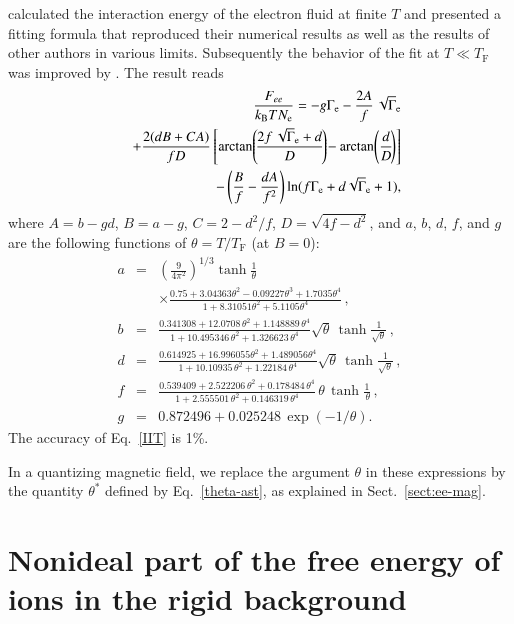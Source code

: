 \documentclass[traditabstract]{aa}
\newcommand{\bea}{\begin{eqnarray}}
\newcommand{\eea}{\end{eqnarray}}
\newcommand{\req}[1]{Eq.~\ref{#1}}
\newcommand{\Gamme}{\Gamma_\mathrm{e}}
\newcommand{\Nel}{N_\mathrm{e}}
\newcommand{\kB}{k_\mathrm{B}}
\newcommand{\TF}{T_\mathrm{F}}
\begin{document}
\citet{Tanaka85} calculated the interaction energy
of the electron fluid at finite $T$ and
presented a fitting formula that reproduced their numerical
results as well as the results of other authors in various limits.
Subsequently the behavior of the fit at $T\ll\TF$ was improved
by \citet{IIT}. The result reads
\bea&&\hspace*{-1em}
   \frac{F_{ee} }{ \kB T \Nel } = - g \Gamme - \frac{2A}{f}\,\sqrt\Gamme
\nonumber\\&&
   +
       \frac{2 (dB+CA)}{ f D }
  \left[\arctan\!\left(\! \frac{2f\,\sqrt\Gamme + d }{ D} \!\right)\!
      - \arctan\!\left(\frac{d}{D}\!\right) \right]
\nonumber\\&&
      - \left( \frac{B}{ f} - \frac{dA }{ f^2} \right)
       \ln ( f\Gamme+d\sqrt\Gamme+1),
\label{IIT}
\eea
where $A=b-gd$, $B=a-g$,
$C=2-d^2/f$, $D=\sqrt{4f-d^2}$, 
and $a$, $b$, $d$, $f$, and
$g$ are the following functions of $\theta=T/\TF$ (at $B=0$):
\bea
    a &=& \left( \frac{9}{4\pi^2} \right)^{1/3}
       \tanh\frac1\theta
\nonumber\\&&\times
      \frac{ 0.75 + 3.04363 \theta^2 -0.09227\theta^3 + 1.7035\theta^4
         }{ 1+8.31051\theta^2 +5.1105\theta^4}\,,
\nonumber\\
    b &=& 
        \frac{ 0.341308 + 12.0708\,\theta^2 + 1.148889 \,\theta^4
     }{ 1 + 10.495346 \,\theta^2 + 1.326623 \,\theta^4 }
      \sqrt\theta\,\tanh\frac{1}{\sqrt\theta}\,,
\nonumber\\
    d &=& \!\!
        \frac{0.614925 + 16.996055 \theta^2 + 1.489056 \theta^4
      }{ 1 + 10.10935 \,\theta^2 + 1.22184 \,\theta^4 }
      \sqrt\theta\,\tanh\frac{1}{\sqrt\theta}\,,
\nonumber\\
    f &=& 
        \frac{0.539409 + 2.522206 \,\theta^2 + 0.178484 \,\theta^4
      }{ 1 + 2.555501 \,\theta^2 + 0.146319 \,\theta^4 }
      \,\theta\,\tanh\frac{1}{\,\theta}\,,
\nonumber\\
    g &=& 0.872496 + 0.025248\,\exp(-1/\theta).
\nonumber
\eea
The accuracy of \req{IIT} is 1\%.

In a quantizing magnetic field, we replace the argument
$\theta$ in these expressions by the quantity $\theta^\ast$
defined by \req{theta-ast}, as explained in
Sect.~\ref{sect:ee-mag}.

\section{Nonideal part of the free energy
of ions in the rigid background}
\end{document}
